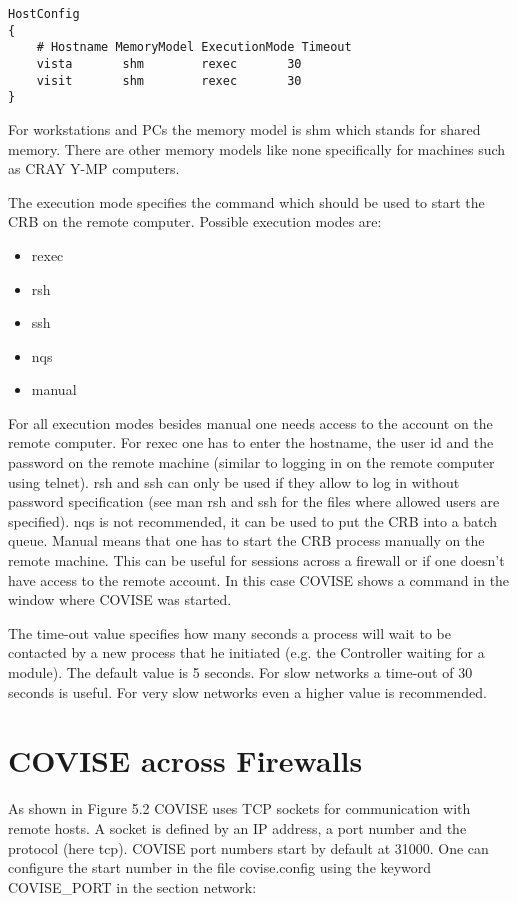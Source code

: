 \begin{verbatim}
HostConfig
{
    # Hostname MemoryModel ExecutionMode Timeout
    vista       shm        rexec       30
    visit       shm        rexec       30
}
\end{verbatim}

For workstations and PCs the memory model is shm which stands for shared memory. There 
are other memory models like none specifically for machines such as CRAY Y-MP computers.

The execution mode specifies the command which should be used to start the CRB on the remote computer. Possible
execution modes are:

\begin{itemize}
\item rexec
\item rsh
\item ssh
\item nqs
\item manual
\end{itemize}

For all execution modes besides manual one needs access to the account on the remote 
computer. For rexec one has to enter the hostname, the user id and the password on the 
remote machine (similar to logging in on the remote computer using telnet). rsh and ssh 
can only be used if they allow to log in without password specification (see man rsh and 
ssh for the files where allowed users are specified). nqs is not recommended, it can be 
used to put the CRB into a batch queue. Manual means that one has to start the CRB 
process manually on the remote machine. This can be useful for sessions across a 
firewall or if one doesn't have access to the remote account. In this case COVISE 
shows a command in the window where COVISE was started.

The time-out value specifies how many seconds a process will wait to be contacted by a 
new process that he initiated (e.g. the Controller waiting for a module). The default 
value is 5 seconds. For slow networks a time-out of 30 seconds is useful. For very 
slow networks even a higher value is recommended.


\section{COVISE across Firewalls}

As shown in Figure 5.2 COVISE uses TCP sockets for communication with remote hosts. 
A socket is defined by an IP address, a port number and the protocol (here tcp). COVISE 
port numbers start by default at 31000. One can configure the start number in the 
file covise.config using the keyword COVISE\_PORT in the section network:
 
